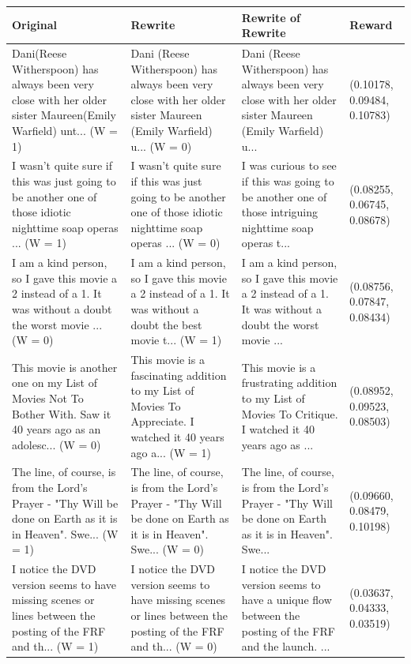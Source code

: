 \documentclass{article}
\begin{document}
\begin{table}[H]
  \centering
  \small
  \begin{tabular}{|p{}|p{}|p{}|p{}|}\hline
  Original & Rewrite & Rewrite of Rewrite & Reward \\ \hline
  Dani(Reese Witherspoon) has always been very close with her older sister Maureen(Emily Warfield) unt... (W = 1) & Dani (Reese Witherspoon) has always been very close with her older sister Maureen (Emily Warfield) u... (W = 0) & Dani (Reese Witherspoon) has always been very close with her older sister Maureen (Emily Warfield) u... & (0.10178, 0.09484, 0.10783) \\ \hline
  I wasn't quite sure if this was just going to be another one of those idiotic nighttime soap operas ... (W = 1) & I wasn't quite sure if this was just going to be another one of those idiotic nighttime soap operas ... (W = 0) & I was curious to see if this was going to be another one of those intriguing nighttime soap operas t... & (0.08255, 0.06745, 0.08678) \\ \hline
  I am a kind person, so I gave this movie a 2 instead of a 1. It was without a doubt the worst movie ... (W = 0) & I am a kind person, so I gave this movie a 2 instead of a 1. It was without a doubt the best movie t... (W = 1) & I am a kind person, so I gave this movie a 2 instead of a 1. It was without a doubt the worst movie ... & (0.08756, 0.07847, 0.08434) \\ \hline
  This movie is another one on my List of Movies Not To Bother With. Saw it 40 years ago as an adolesc... (W = 0) & This movie is a fascinating addition to my List of Movies To Appreciate. I watched it 40 years ago a... (W = 1) & This movie is a frustrating addition to my List of Movies To Critique. I watched it 40 years ago as ... & (0.08952, 0.09523, 0.08503) \\ \hline
  The line, of course, is from the Lord's Prayer - "Thy Will be done on Earth as it is in Heaven". Swe... (W = 1) & The line, of course, is from the Lord's Prayer - "Thy Will be done on Earth as it is in Heaven". Swe... (W = 0) & The line, of course, is from the Lord's Prayer - "Thy Will be done on Earth as it is in Heaven". Swe... & (0.09660, 0.08479, 0.10198) \\ \hline
  I notice the DVD version seems to have missing scenes or lines between the posting of the FRF and th... (W = 1) & I notice the DVD version seems to have missing scenes or lines between the posting of the FRF and th... (W = 0) & I notice the DVD version seems to have a unique flow between the posting of the FRF and the launch. ... & (0.03637, 0.04333, 0.03519) \\ \hline

\end{tabular}
\end{table}
\end{document}
